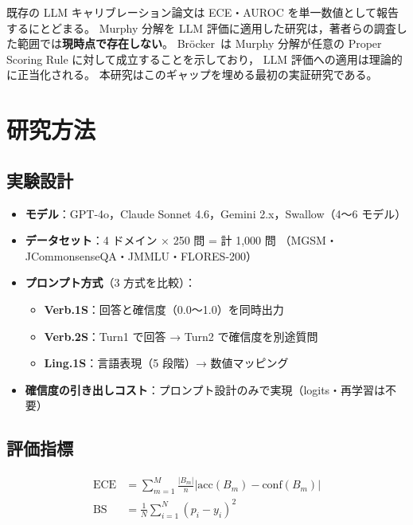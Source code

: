 \documentclass[10pt,a4paper,twocolumn]{article}
\begin{document}
既存の LLM キャリブレーション論文は ECE・AUROC を単一数値として報告するにとどまる。
Murphy 分解を LLM 評価に適用した研究は，著者らの調査した範囲では\textbf{現時点で存在しない}。
Bröcker~\cite{brocker2009reliability}は Murphy 分解が任意の Proper Scoring Rule に対して成立することを示しており，
LLM 評価への適用は理論的に正当化される。
本研究はこのギャップを埋める最初の実証研究である。

\section{研究方法}

\subsection*{実験設計}

\begin{itemize}
  \item \textbf{モデル}：GPT-4o，Claude Sonnet 4.6，Gemini 2.x，Swallow（4〜6 モデル）
  \item \textbf{データセット}：4 ドメイン × 250 問 = 計 1,000 問
        （MGSM・JCommonsenseQA・JMMLU・FLORES-200）
  \item \textbf{プロンプト方式}（3 方式を比較）：
        \begin{itemize}
          \item \textbf{Verb.1S}：回答と確信度（0.0〜1.0）を同時出力
          \item \textbf{Verb.2S}：Turn1 で回答 → Turn2 で確信度を別途質問
          \item \textbf{Ling.1S}：言語表現（5 段階）→ 数値マッピング
        \end{itemize}
  \item \textbf{確信度の引き出しコスト}：プロンプト設計のみで実現（logits・再学習は不要）
\end{itemize}

\subsection*{評価指標}

\begin{align}
  \text{ECE} &= \sum_{m=1}^{M} \frac{|B_m|}{n} \left|\text{acc}(B_m) - \text{conf}(B_m)\right| \\
  \text{BS} &= \frac{1}{N} \sum_{i=1}^{N} (p_i - y_i)^2
\end{align}
\end{document}
